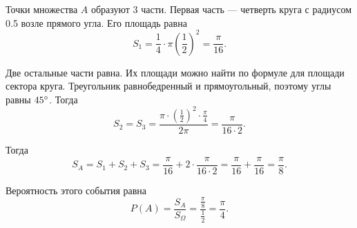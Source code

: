 Точки множества $A$ образуют 3 части.
Первая часть --- четверть круга с радиусом 0.5 возле прямого угла.
Его площадь равна
$$S_1 =
\frac{1}{4} \cdot \pi \left( \frac{1}{2} \right)^2 =
\frac{ \pi }{16}.$$

Две остальные части равна.
Их площади можно найти по формуле для площади сектора круга.
Треугольник равнобедренный и прямоугольный, поэтому углы равны $45 \degree$.
Тогда
$$S_2 =
S_3 =
\frac{ \pi \cdot  \left( \frac{1}{2} \right)^2 \cdot \frac{ \pi }{4}}{2 \pi } =
\frac{ \pi }{16 \cdot 2}.$$

Тогда
$$S_A =
S_1 + S_2 + S_3 =
\frac{ \pi }{16} + 2 \cdot \frac{ \pi }{16 \cdot 2} =
\frac{ \pi }{16} + \frac{ \pi }{16} =
\frac{ \pi }{8}.$$

Вероятность этого события равна
$$P \left( A \right) =
\frac{S_A}{S_{ \Omega }} =
\frac{ \frac{ \pi }{8} }{ \frac{1}{2} } =
\frac{ \pi }{4}.$$
